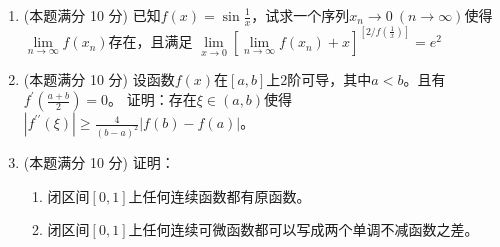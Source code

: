 \begin{enumerate}


\item 
(本题满分 10 分)
已知$ f(x)=\sin \frac{1}{x} $，试求一个序列$ x_{n} \rightarrow 0 \ (n \rightarrow \infty) $使得$ \lim\limits _{n \rightarrow \infty} f\left(x_{n}\right) $存在，且满足
$ \lim\limits _{x \rightarrow 0}\left[\lim\limits _{n \rightarrow \infty} f\left(x_{n}\right)+x\right]^{\left[ 2/f(\frac{1}{x}) \right]}=e^{2} $



\item 
(本题满分 10 分)
设函数$ f(x) $在$[a, b]$上$ 2 $阶可导，其中$ a<b $。且有$ f^{\prime}\left(\frac{a+b}{2}\right)=0 $。
证明：存在$ \xi	\in(a,b) $使得$\left|f^{\prime \prime}(\xi)\right| \geq \frac{4}{(b-a)^{2}}|f(b)-f(a)|$。




\item 
(本题满分 10 分)
证明：
\begin{enumerate}
	\item
闭区间$ [0,1] $上任何连续函数都有原函数。

\item
闭区间$ [0,1] $上任何连续可微函数都可以写成两个单调不减函数之差。
\end{enumerate}

\end{enumerate}
